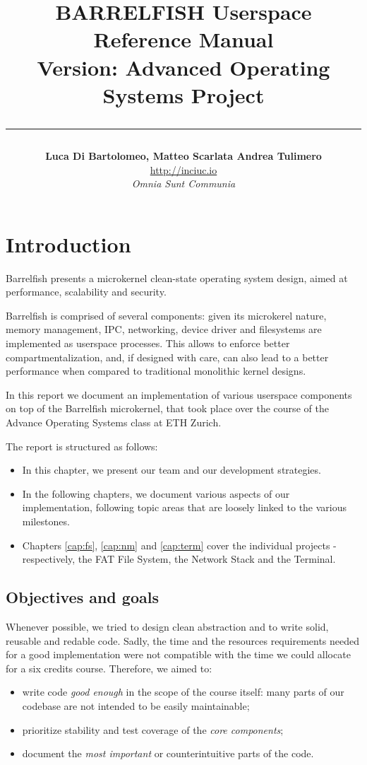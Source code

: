 \documentclass[a4paper,twoside,openright]{report}
\title{\textbf{BARRELFISH Userspace Reference Manual}\\ Version: Advanced Operating Systems Project\\\rule{\linewidth}{3pt}}
\author{\textbf{Luca Di Bartolomeo, Matteo Scarlata Andrea Tulimero} \hspace*{-\tabcolsep}\\ \hfill \url{http://inciuc.io}\\ \hfill \textit{Omnia Sunt Communia}}
\begin{document}
\begingroup
\let\center\flushright
\let\endcenter\endflushright
\maketitle
\endgroup

\chapter{Introduction}
Barrelfish \cite{barrelfish} presents a microkernel clean-state operating system design, aimed at performance, scalability and security.

Barrelfish is comprised of several components: given its microkerel nature, memory management, IPC, networking, device driver and filesystems are implemented as userspace processes. This allows to enforce better compartmentalization, and, if designed with care, can also lead to a better performance when compared to traditional monolithic kernel designs. 

In this report we document an implementation of various userspace components on top of the Barrelfish microkernel, that took place over the course of the Advance Operating Systems class at ETH Zurich.

The report is structured as follows:
\begin{itemize}
	\item In this chapter, we present our team and our development strategies.
	\item In the following chapters, we document various aspects of our implementation, following topic areas that are loosely linked to the various milestones.
	\item Chapters \ref{cap:fs}, \ref{cap:nm} and \ref{cap:term} cover the individual projects - respectively, the FAT File System, the Network Stack and the Terminal.
	
\end{itemize}


\section{Objectives and goals}
Whenever possible, we tried to design clean abstraction and to write solid, reusable and redable code. Sadly, the time and the resources requirements needed for a good implementation were not compatible with the time we could allocate for a six credits course. Therefore, we aimed to:

\begin{itemize}
    \item write code \textit{good enough} in the scope of the course itself: many parts of our codebase are not intended to be easily maintainable;
    \item prioritize stability and test coverage of the \textit{core components}; 
    \item document the \textit{most important} or counterintuitive parts of the code.
\end{itemize}
\end{document}
